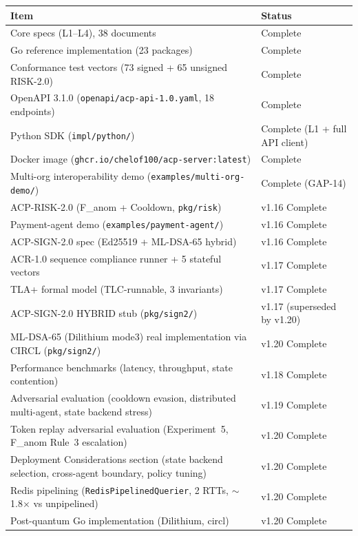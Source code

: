 \documentclass[11pt]{article}
\theoremstyle{definition}
\begin{document}
\begin{table}[h!]
\centering
\small
\begin{tabular}{@{}p{9.5cm}l@{}}
\toprule
\textbf{Item} & \textbf{Status} \\
\midrule
Core specs (L1--L4), 38 documents & Complete \\
Go reference implementation (23 packages) & Complete \\
Conformance test vectors (73 signed + 65 unsigned RISK-2.0) & Complete \\
OpenAPI 3.1.0 (\texttt{openapi/acp-api-1.0.yaml}, 18 endpoints) & Complete \\
Python SDK (\texttt{impl/python/}) & Complete (L1 + full API client) \\
Docker image (\texttt{ghcr.io/chelof100/acp-server:latest}) & Complete \\
Multi-org interoperability demo (\texttt{examples/multi-org-demo/}) & Complete (GAP-14) \\
ACP-RISK-2.0 (F\_anom + Cooldown, \texttt{pkg/risk}) & v1.16 Complete \\
Payment-agent demo (\texttt{examples/payment-agent/}) & v1.16 Complete \\
ACP-SIGN-2.0 spec (Ed25519 + ML-DSA-65 hybrid) & v1.16 Complete \\
ACR-1.0 sequence compliance runner + 5 stateful vectors & v1.17 Complete \\
TLA+ formal model (TLC-runnable, 3 invariants) & v1.17 Complete \\
ACP-SIGN-2.0 HYBRID stub (\texttt{pkg/sign2/}) & v1.17 (superseded by v1.20) \\
ML-DSA-65 (Dilithium mode3) real implementation via CIRCL (\texttt{pkg/sign2/}) & v1.20 Complete \\
Performance benchmarks (latency, throughput, state contention) & v1.18 Complete \\
Adversarial evaluation (cooldown evasion, distributed multi-agent, state backend stress) & v1.19 Complete \\
Token replay adversarial evaluation (Experiment~5, F\_anom Rule~3 escalation) & v1.20 Complete \\
Deployment Considerations section (state backend selection, cross-agent boundary, policy tuning) & v1.20 Complete \\
Redis pipelining (\texttt{RedisPipelinedQuerier}, 2 RTTs, $\sim$1.8$\times$ vs unpipelined) & v1.20 Complete \\
Post-quantum Go implementation (Dilithium, circl) & v1.20 Complete \\

\end{tabular}
\end{table}
\end{document}
